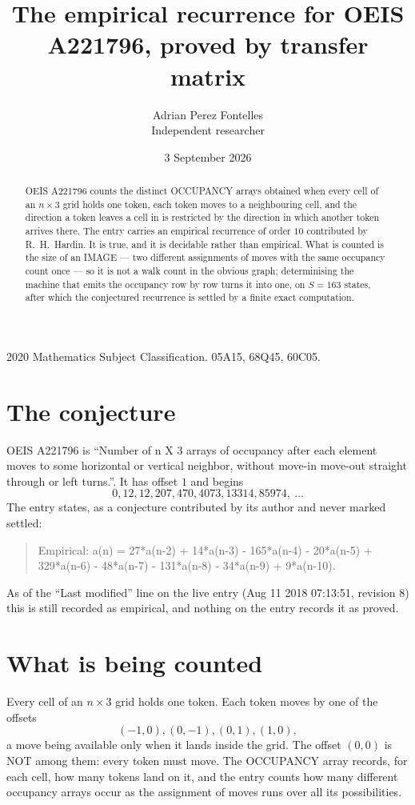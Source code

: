 \documentclass[11pt,a4paper]{article}
\title{The empirical recurrence for OEIS A221796, proved by transfer matrix}
\author{Adrian Perez Fontelles\\ \small Independent researcher}
\date{3 September 2026}
\theoremstyle{plain}
\theoremstyle{definition}
\begin{document}
\maketitle

\begin{abstract}
OEIS A221796 counts the distinct OCCUPANCY arrays obtained when every cell of an $n\times3$ grid
holds one token, each token moves to a neighbouring cell, and the direction a token leaves a
cell in is restricted by the direction in which another token arrives there. The entry carries
an empirical recurrence of order $10$ contributed by R.~H.~Hardin. It is true, and it is
decidable rather than empirical. What is counted is the size of an IMAGE --- two different
assignments of moves with the same occupancy count once --- so it is not a walk count in the
obvious graph; determinising the machine that emits the occupancy row by row turns it into
one, on $S=163$ states, after which the conjectured recurrence is settled by a finite exact
computation.
\end{abstract}

\noindent\small 2020 Mathematics Subject Classification. 05A15, 68Q45, 60C05.\normalsize

\section{The conjecture}

OEIS A221796 is ``Number of n X 3 arrays of occupancy after each element moves to some horizontal or vertical neighbor, without move-in move-out straight through or left turns.''. It has offset $1$ and begins
\[
0, 12, 12, 207, 470, 4073, 13314, 85974,\ \dots
\]
The entry states, as a conjecture contributed by its author and never marked settled:
\begin{quote}
Empirical: a(n) = 27*a(n-2) + 14*a(n-3) - 165*a(n-4) - 20*a(n-5) + 329*a(n-6) - 48*a(n-7) - 131*a(n-8) - 34*a(n-9) + 9*a(n-10).
\end{quote}
As of the ``Last modified'' line on the live entry (Aug 11 2018 07:13:51, revision 8) this is still
recorded as empirical, and nothing on the entry records it as proved.

\section{What is being counted}

Every cell of an $n\times3$ grid holds one token. Each token moves by one of the offsets
\[
(-1,0), (0,-1), (0,1), (1,0),
\]
a move being available only when it lands inside the grid. The offset $(0,0)$ is NOT among them: every token must move. The OCCUPANCY array
records, for each cell, how many tokens land on it, and the entry counts how many different
occupancy arrays occur as the assignment of moves runs over all its possibilities.
\end{document}
